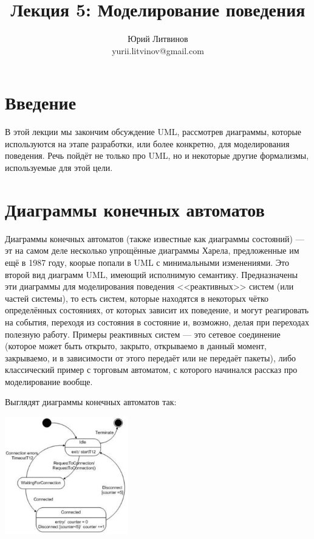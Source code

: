 \documentclass[a5paper]{article}
\title{Лекция 5:  Моделирование поведения}
\author{Юрий Литвинов\\\small{yurii.litvinov@gmail.com}}
\date{}
\begin{document}
\maketitle
\thispagestyle{empty}

\section{Введение}

В этой лекции мы закончим обсуждение UML, рассмотрев диаграммы, которые используются на этапе разработки, или более конкретно, для моделирования поведения. Речь пойдёт не только про UML, но и некоторые другие формализмы, используемые для этой цели.

\section{Диаграммы конечных автоматов}

Диаграммы конечных автоматов (также известные как диаграммы состояний) --- эт на самом деле несколько упрощённые диаграммы Харела, предложенные им ещё в 1987 году, коорые попали в UML с минимальными изменениями. Это второй вид диаграмм UML, имеющий исполнимую семантику. Предназначены эти диаграммы для моделирования поведения <<реактивных>> систем (или частей системы), то есть систем, которые находятся в некоторых чётко определённых состояниях, от которых зависит их поведение, и могут реагировать на события, переходя из состояния в состояние и, возможно, делая при переходах полезную работу. Примеры реактивных систем --- это сетевое соединение (которое может быть открыто, закрыто, открываемо в данный момент, закрываемо, и в зависимости от этого передаёт или не передаёт пакеты), либо классический пример с торговым автоматом, с которого начинался рассказ про моделирование вообще.

Выглядят диаграммы конечных автоматов так:

\begin{center}
	\includegraphics[width=0.4\textwidth]{stateTransitionExample.png}
\end{center}
\end{document}
